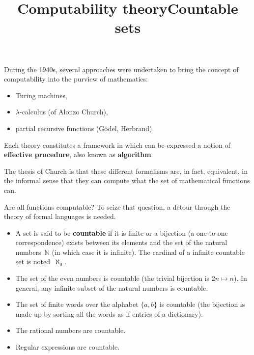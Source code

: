 \documentclass[wide]{slides}
\begin{document}
\begin{slide}
  \title{Computability theory}

  During the 1940s, several approaches were undertaken to bring the
  concept of computability into the purview of mathematics:
  \begin{itemize}

    \item Turing machines,

    \item $\lambda$-calculus (of Alonzo Church),

    \item partial recursive functions (G\"odel, Herbrand).

  \end{itemize}
  Each theory constitutes a framework in which can be expressed a
  notion of \textbf{effective procedure}, also known as
  \textbf{algorithm}.

  \medskip

  The thesis of Church is that these different formalisms are, in
  fact, equivalent, in the informal sense that they can compute what
  the set of mathematical functions can.

\end{slide}

\begin{slide}
  \title{Countable sets}

  Are all functions computable? To seize that question, a detour
  through the theory of formal languages is needed.
  \begin{itemize}

    \item A set is said to be \textbf{countable} if it is finite or a
      bijection (a one-to-one correspondence) exists between its
      elements and the set of the natural numbers~$\mathbb{N}$ (in
      which case it is infinite). The cardinal of a infinite countable
      set is noted~$\aleph_0$.

    \item The set of the even numbers is countable (the trivial
      bijection is $2n \mapsto n$). In general, any infinite subset of
      the natural numbers is countable.

    \item The set of finite words over the alphabet $\{a,b\}$ is
      countable (the bijection is made up by sorting all the words as
      if entries of a dictionary).

    \item The rational numbers are countable.

    \item Regular expressions are countable.

  \end{itemize}
\end{slide}
\end{document}
